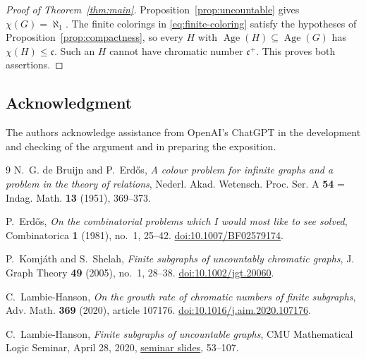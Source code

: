 \documentclass[11pt,leqno]{amsart}
\theoremstyle{definition}
\numberwithin{equation}{section}
\newcommand{\cc}{\mathfrak c}
\newcommand{\Age}{\operatorname{Age}}
\newcommand{\sub}{\subseteq}
\begin{document}
\begin{proof}[Proof of Theorem~\ref{thm:main}]
Proposition~\ref{prop:uncountable} gives $\chi(G)=\aleph_1$. The finite colorings in \eqref{eq:finite-coloring} satisfy the hypotheses of Proposition~\ref{prop:compactness}, so every $H$ with $\Age(H)\sub\Age(G)$ has $\chi(H)\le\cc$. Such an $H$ cannot have chromatic number $\cc^+$. This proves both assertions.
\end{proof}

\subsection*{Acknowledgment}
The authors acknowledge assistance from OpenAI's ChatGPT in the development and checking of the argument and in preparing the exposition.

\begin{thebibliography}{9}
N.~G. de Bruijn and P.~Erd\H{o}s,
\emph{A colour problem for infinite graphs and a problem in the theory of relations},
Nederl. Akad. Wetensch. Proc. Ser. A \textbf{54} = Indag. Math. \textbf{13} (1951), 369--373.

P.~Erd\H{o}s,
\emph{On the combinatorial problems which I would most like to see solved},
Combinatorica \textbf{1} (1981), no.~1, 25--42.
\href{https://doi.org/10.1007/BF02579174}{doi:10.1007/BF02579174}.

P.~Komj\'ath and S.~Shelah,
\emph{Finite subgraphs of uncountably chromatic graphs},
J. Graph Theory \textbf{49} (2005), no.~1, 28--38.
\href{https://doi.org/10.1002/jgt.20060}{doi:10.1002/jgt.20060}.

C.~Lambie-Hanson,
\emph{On the growth rate of chromatic numbers of finite subgraphs},
Adv. Math. \textbf{369} (2020), article 107176.
\href{https://doi.org/10.1016/j.aim.2020.107176}{doi:10.1016/j.aim.2020.107176}.

C.~Lambie-Hanson,
\emph{Finite subgraphs of uncountable graphs},
CMU Mathematical Logic Seminar, April 28, 2020,
\href{https://speakerdeck.com/clambiehanson/finite-subgraphs-of-uncountable-graphs}{seminar slides}, 53--107.
\end{thebibliography}
\end{document}
